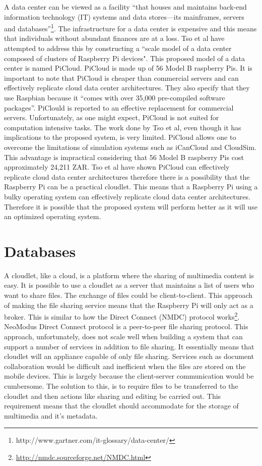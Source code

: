 A data center can be viewed as a facility ``that houses and maintains back-end information technology (IT) systems and data stores—its mainframes, servers and databases''\footnote{http://www.gartner.com/it-glossary/data-center/}.
The infrastructure for a data center is expensive and this means that individuals without abundant finances are at a loss. Tso et al\cite{tso2013glasgow} have attempted to address this by constructing a ``scale model of a data center composed of clusters of Raspberry Pi devices". This proposed model of a data center is named PiCloud. PiCloud is made up of 56 Model B raspberry Pis.
It is important to note that PiCloud is cheaper than commercial servers and can effectively replicate cloud data center architectures. They also specify that they use Raspbian because it “comes with over 35,000 pre-compiled software packages”. PiClould is reported to an effective replacement for commercial servers. Unfortunately, as one might expect, PiCloud is not suited for computation intensive tasks. The work done by Tso et al\cite{tso2013glasgow}, even though it has implications to the proposed system, is very limited. PiCloud allows one to overcome the limitations of simulation systems such as iCanCloud
and CloudSim. This advantage is impractical considering that 56 Model B raspberry Pis cost approximately 24,211 ZAR. Tso et al\cite{tso2013glasgow} have shown PiCloud can effectively replicate cloud data center architectures therefore there is a possibility that the Raspberry Pi can be a practical cloudlet. This means that a Raspberry Pi using a bulky operating system can effectively replicate cloud data center architectures. Therefore it is possible that the proposed system will perform better as it will use an optimized operating system.\newline


\section{Databases}

A cloudlet, like a cloud, is a platform where the sharing of multimedia content is easy. It is possible to use a cloudlet as a server that maintains a list of users who want to share files. The exchange of files
could be client-to-client. This approach of making the file sharing service means that the Raspberry Pi will only act as a broker. This is similar to how the Direct Connect (NMDC) protocol works\footnote{\url{http://nmdc.sourceforge.net/NMDC.html}}. NeoModus Direct Connect protocol is a peer-to-peer file sharing protocol. This approach, unfortunately, does not scale well when building a system that can support a number of services in addition to file sharing. It essentially means that cloudlet will an appliance capable of only file sharing.
Services such as document collaboration would be difficult and inefficient when the files are stored on the mobile devices. This is largely because the client-server communication would be cumbersome. The solution
to this, is to require files to be transferred to the cloudlet and then actions like sharing and editing be carried out. This requirement means that the cloudlet should accommodate for the storage of multimedia and
it's metadata.\newline


